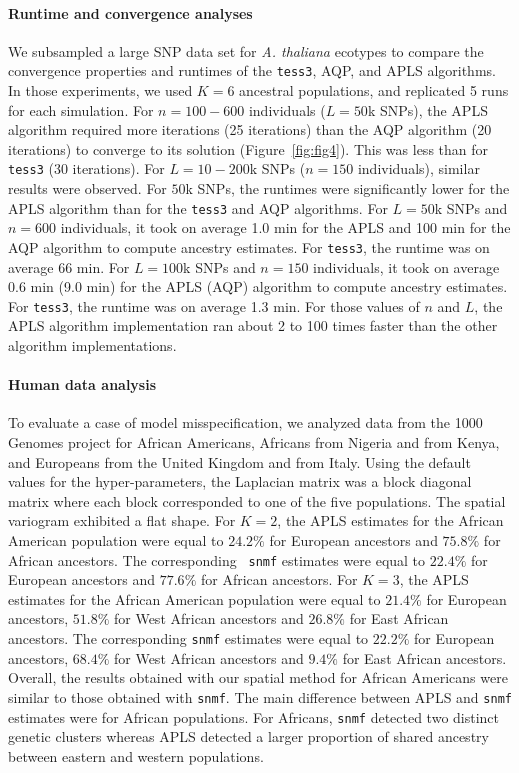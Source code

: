 \paragraph{Runtime and convergence analyses} We subsampled a large SNP data set
for {\it A. thaliana} ecotypes to compare the convergence properties and
runtimes of the {\tt tess3}, AQP, and APLS algorithms. In those experiments, we
used $K = 6$ ancestral populations, and replicated 5 runs for each simulation.
For $n = 100-600$ individuals ($L = 50$k SNPs), the APLS algorithm required more
iterations (25 iterations) than the AQP algorithm (20 iterations) to converge to
its solution (Figure~\ref{fig:fig4}). This was less than for {\tt tess3} (30 iterations). For
$L = 10-200$k SNPs ($n = 150$ individuals), similar results were observed. For
$50$k SNPs, the runtimes were significantly lower for the APLS algorithm than
for the {\tt tess3} and AQP algorithms. For $L = 50$k SNPs and $n = 600$
individuals, it took on average 1.0 min for the APLS and 100 min for the AQP
algorithm to compute ancestry estimates. For {\tt tess3}, the runtime was on
average 66 min. For $L = 100$k SNPs and $n = 150$ individuals, it took on
average 0.6 min (9.0 min) for the APLS (AQP) algorithm to compute ancestry
estimates. For {\tt tess3}, the runtime was on average 1.3 min. For those
values of $n$ and $L$, the APLS algorithm implementation ran about 2 to 100
times faster than the other algorithm implementations.
 
\paragraph{Human data analysis} To evaluate a case of model misspecification, we
analyzed data from the 1000 Genomes project for African Americans, Africans from
Nigeria and from Kenya, and Europeans from the United Kingdom and from Italy.
Using the default values for the hyper-parameters, the Laplacian matrix was a
block diagonal matrix where each block corresponded to one of the five
populations. The spatial variogram exhibited a flat shape. For $K = 2$, the APLS
estimates for the African American population were equal to $24.2 \%$ for
European ancestors and $75.8 \%$ for African ancestors. The corresponding {\tt
  snmf} estimates were equal to $22.4 \%$ for European ancestors and $77.6 \%$
for African ancestors. For $K = 3$, the APLS estimates for the African American
population were equal to $21.4 \%$ for European ancestors, $51.8 \%$ for West
African ancestors and $26.8 \%$ for East African ancestors. The corresponding
{\tt snmf} estimates were equal to $22.2 \%$ for European ancestors, $68.4 \%$
for West African ancestors and $9.4 \%$ for East African ancestors. Overall, the
results obtained with our spatial method for African Americans were similar to
those obtained with {\tt snmf}. The main difference between APLS and {\tt snmf}
estimates were for African populations. For Africans, {\tt snmf} detected two
distinct genetic clusters whereas APLS detected a larger proportion of shared
ancestry between eastern and western populations.


